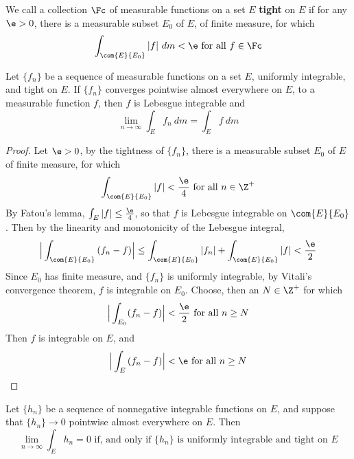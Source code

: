 \begin{definition}
    We call a collection $\Fc$ of measurable functions on a set  $E$
    \textbf{tight} on $E$ if for any  $\e>0$, there is a measurable subset $E_0$
    of $E$, of finite measure, for which
    \begin{equation*}
        \int_{\com{E}{E_0}}{|f| \ dm}<\e \text{ for all } f \in \Fc
    \end{equation*}
\end{definition}

\begin{theorem}\label{10.5.7}
    Let $\{f_n\}$ be a sequence of measurable functions on a set $E$, uniformly
    integrable, and tight on $E$. If  $\{f_n\}$ converges pointwise almost
    everywhere on $E$, to a measurable function $f$, then $f$ is Lebesgue
    integrable and
    \begin{equation*}
        \lim_{n \xrightarrow{} \infty}\int_E{f_n \ dm}=\int_E{f \ dm}
    \end{equation*}
\end{theorem}
\begin{proof}
    Let $\e>0$, by the tightness of $\{f_n\}$, there is a measurable subset
    $E_0$ of $E$ of finite measure, for which
    \begin{equation*}
        \int_{\com{E}{E_0}}{|f|}<\frac{\e}{4} \text{ for all } n \in \Z^+
    \end{equation*}
    By Fatou's lemma, $\int_E{|f|} \leq \frac{\e}{4}$, so that $f$ is Lebesgue
    integrable on  $\com{E}{E_0}$. Then by the linearity and monotonicity of the
    Lebesgue integral,
    \begin{equation*}
        \Big{|} \int_{\com{E}{E_0}}{(f_n-f)} \Big{|} \leq
        \int_{\com{E}{E_0}}{|f_n|}+\int_{\com{E}{E_0}}{|f|}<\frac{\e}{2}
    \end{equation*}
    Since $E_0$ has finite measure, and $\{f_n\}$ is uniformly integrable, by
    Vitali's convergence theorem, $f$ is integrable on $E_0$. Choose, then an $N
   \in \Z^+$ for which
    \begin{equation*}
        \Big{|} \int_{E_0}(f_n-f) \Big{|}<\frac{\e}{2} \text{ for all } n \geq N
    \end{equation*}
    Then $f$ is integrable on  $E$, and
    \begin{equation*}
        \Big{|} \int_E{(f_n-f)} \Big{|}<\e \text{ for all } n \geq N
    \end{equation*}
\end{proof}
\begin{corollary}
    Let $\{h_n\}$ be a sequence of nonnegative integrable functions on $E$, and
    suppose that  $\{h_n\} \xrightarrow{} 0$ pointwise almost everywhere on $E$.
    Then
    \begin{equation*}
        \lim_{n \xrightarrow{} \infty}{\int_E{h_n}}=0 \text{ if, and only if }
        \{h_n\} \text{ is uniformly integrable and tight on } E
    \end{equation*}
\end{corollary}
